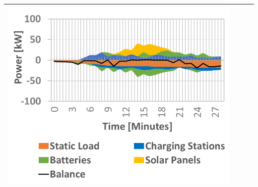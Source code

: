 \begin{table}[b]
\begin{tabularx}{\textwidth}{|Y|Y|Y|Y|}
		\includegraphics[trim=0 0 0 -3,scale=0.285]{../gfx/data/image002.png} \\ \hline
		

\end{tabularx}
\end{table}
